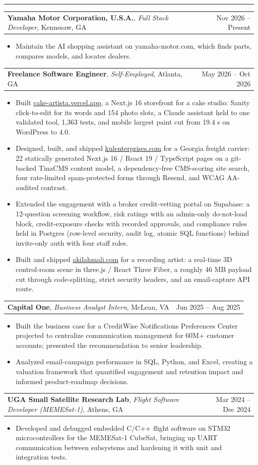 \documentclass[letterpaper,10pt]{article}
\makeatletter
\newcommand{\IfEmpty}[3]{\if\relax\detokenize{#1}\relax#2\else#3\fi}
\newcommand{\sectiontitle}[1]{\vspace{4pt}{\textbf{\large #1}}\par\vspace{-6pt}\rule{\textwidth}{0.4pt}\par\vspace{1pt}}
\newcommand{\experienceheading}[4]{\begin{tabularx}{\textwidth}{@{}X r@{}}\textbf{#1}\IfEmpty{#2}{}{, \textit{#2}}\IfEmpty{#3}{}{, #3} & #4 \\ \end{tabularx}\par\vspace{1pt}}
\makeatother
\begin{document}
\sectiontitle{EXPERIENCE}
\experienceheading{Yamaha Motor Corporation, U.S.A.}{Full Stack Developer}{Kennesaw, GA}{Nov 2026 -- Present}
\begin{itemize}
\item Maintain the AI shopping assistant on yamaha-motor.com, which finds parts, compares models, and locates dealers.
\end{itemize}
\experienceheading{Freelance Software Engineer}{Self-Employed}{Atlanta, GA}{May 2026 -- Oct 2026}
\begin{itemize}
\item Built \href{https://cake-artista.vercel.app}{cake-artista.vercel.app}, a Next.js 16 storefront for a cake studio: Sanity click-to-edit for its words and 154 photo slots, a Claude assistant held to one validated tool, 1,363 tests, and mobile largest paint cut from 19.4 s on WordPress to 4.0.
\item Designed, built, and shipped \href{https://www.kulenterprises.com}{kulenterprises.com} for a Georgia freight carrier: 22 statically generated Next.js 16 / React 19 / TypeScript pages on a git-backed TinaCMS content model, a dependency-free CMS-scoring site search, four rate-limited spam-protected forms through Resend, and WCAG AA-audited contrast.
\item Extended the engagement with a broker credit-vetting portal on Supabase: a 12-question screening workflow, risk ratings with an admin-only do-not-load block, credit-exposure checks with recorded approvals, and compliance rules held in Postgres (row-level security, audit log, atomic SQL functions) behind invite-only auth with four staff roles.
\item Built and shipped \href{https://www.akilahmali.com}{akilahmali.com} for a recording artist: a real-time 3D control-room scene in three.js / React Three Fiber, a roughly 46 MB payload cut through code-splitting, strict security headers, and an email-capture API route.
\end{itemize}
\experienceheading{Capital One}{Business Analyst Intern}{McLean, VA}{Jun 2025 -- Aug 2025}
\begin{itemize}
\item Built the business case for a CreditWise Notifications Preferences Center projected to centralize communication management for 60M+ customer accounts; presented the recommendation to senior leadership.
\item Analyzed email-campaign performance in SQL, Python, and Excel, creating a valuation framework that quantified engagement and retention impact and informed product-roadmap decisions.
\end{itemize}
\experienceheading{UGA Small Satellite Research Lab}{Flight Software Developer (MEMESat-1)}{Athens, GA}{Mar 2024 -- Dec 2024}
\begin{itemize}
\item Developed and debugged embedded C/C++ flight software on STM32 microcontrollers for the MEMESat-1 CubeSat, bringing up UART communication between subsystems and hardening it with unit and integration tests.
\end{itemize}
\end{document}
